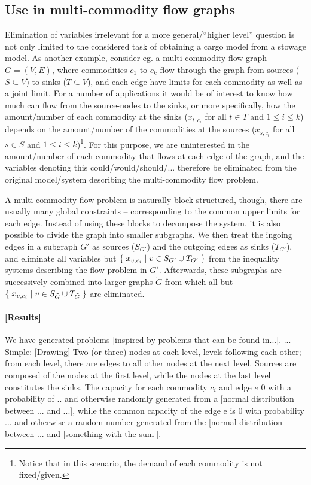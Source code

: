 

\subsection*{Use in multi-commodity flow graphs}
Elimination of variables irrelevant for a more general/``higher level'' question is not only limited to the considered task of obtaining a cargo model from a stowage model. 
As another example, consider eg. a multi-commodity flow graph $G=(V,E)$, where commodities $c_1$ to $c_k$ flow through the graph from sources ($S\subseteq V$) to sinks ($T\subseteq V$), and each edge have limits for each commodity as well as a joint limit. 
For a number of applications it would be of interest to know how much can flow from the source-nodes to the sinks, or more specifically, how the amount/number of each commodity at the sinks ($x_{t, c_i}$ for all $t\in T$ and $1\leq i\leq k$) depends on the amount/number of the commodities at the sources ($x_{s, c_i}$ for all $s\in S$ and $1\leq i\leq k$)\footnote{Notice that in this scenario, the demand of each commodity is not fixed/given.}. For this purpose, we are uninterested in the amount/number of each commodity that flows at each edge of the graph, and the variables denoting this could/would/should/... therefore be eliminated from the original model/system describing the multi-commodity flow problem. 
		
A multi-commodity flow problem is naturally block-structured, though, there are usually many global constraints -- corresponding to the common upper limits for each edge. Instead of using these blocks to decompose the system, it is also possible to divide the graph into smaller subgraphs. We then treat the ingoing edges in a subgraph $G'$ as sources ($S_{G'}$) and the outgoing edges as sinks ($T_{G'}$), and eliminate all variables but $\{\;{x_{v,c_i}}\;|\;{v\in S_{G'}\cup T_{G'}}\;\}$ from the inequality systems describing the flow problem in $G'$. Afterwards, these  subgraphs are successively combined into larger graphs $\tilde{G}$ from which all but $\{\;{x_{v,c_i}}\;|\;{v\in S_{\tilde G}\cup T_{\tilde G}}\;\}$ are eliminated. 

\paragraph{[Results]}
We have generated problems [inspired by problems that can be found in...]. ... Simple: [Drawing] Two (or three) nodes at each level, levels following each other; from each level, there are edges to all other nodes at the next level. Sources are composed of the nodes at the first level, while the nodes at the last level constitutes the sinks. The capacity for each commodity $c_i$ and edge $e$  0 with a probability of .. and otherwise randomly generated from a [normal distribution between ... and ...], while the common capacity of the edge e is 0 with probability ... and otherwise a random number generated from the [normal distribution between ... and [something with the sum]].
